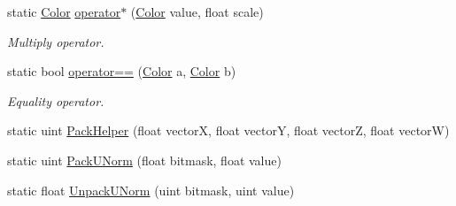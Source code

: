 \begin{DoxyCompactItemize}
static \hyperlink{structMicrosoft_1_1Xna_1_1Framework_1_1Color}{Color} \hyperlink{structMicrosoft_1_1Xna_1_1Framework_1_1Color_a7aa0885c3c0519fff9f37494f472fe93}{operator$\ast$} (\hyperlink{structMicrosoft_1_1Xna_1_1Framework_1_1Color}{Color} value, float scale)
\begin{DoxyCompactList}\small\item\em Multiply operator.\end{DoxyCompactList}\item 
static bool \hyperlink{structMicrosoft_1_1Xna_1_1Framework_1_1Color_a3a1b56f8fe6a3ef9d79d50d5b269e754}{operator==} (\hyperlink{structMicrosoft_1_1Xna_1_1Framework_1_1Color}{Color} a, \hyperlink{structMicrosoft_1_1Xna_1_1Framework_1_1Color}{Color} b)
\begin{DoxyCompactList}\small\item\em Equality operator.\end{DoxyCompactList}\item 
static uint \hyperlink{structMicrosoft_1_1Xna_1_1Framework_1_1Color_a03947c74d601e5fb27b78c17ce49982a}{Pack\+Helper} (float vector\+X, float vector\+Y, float vector\+Z, float vector\+W)
\item 
static uint \hyperlink{structMicrosoft_1_1Xna_1_1Framework_1_1Color_ab833acacef2ae23afbcc79a79ef59def}{Pack\+U\+Norm} (float bitmask, float value)
\item 
static float \hyperlink{structMicrosoft_1_1Xna_1_1Framework_1_1Color_a43f0776c26475564970bd13ac1e734c5}{Unpack\+U\+Norm} (uint bitmask, uint value)
\end{DoxyCompactItemize}
